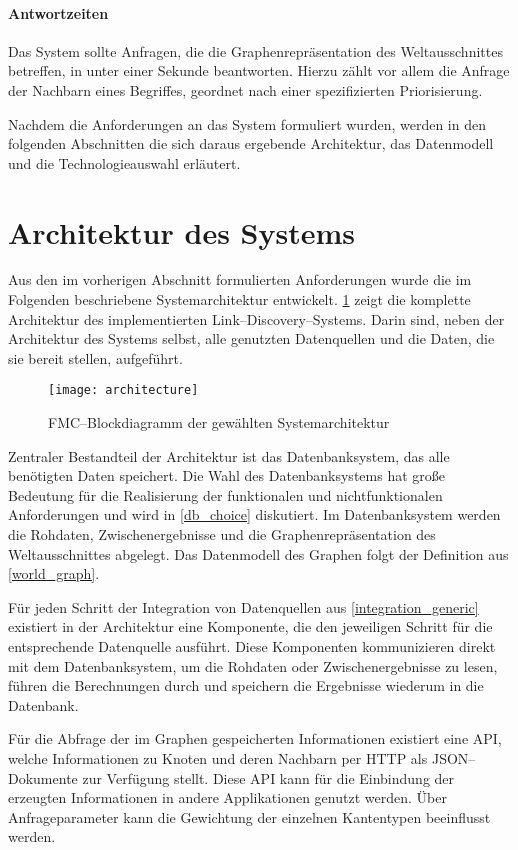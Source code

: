 \paragraph{Antwortzeiten} Das System sollte Anfragen, die die Graphenrepräsentation des Weltausschnittes betreffen, in unter einer Sekunde beantworten. Hierzu zählt vor allem die Anfrage der Nachbarn eines Begriffes, geordnet nach einer spezifizierten Priorisierung.

Nachdem die Anforderungen an das System formuliert wurden, werden in den folgenden Abschnitten die sich daraus ergebende Architektur, das Datenmodell und die Technologieauswahl erläutert.

\section{Architektur des Systems}
\label{architecture}

Aus den im vorherigen Abschnitt formulierten Anforderungen wurde die im Folgenden beschriebene Systemarchitektur entwickelt. \cref{fig:architecture} zeigt die komplette Architektur des implementierten Link--Discovery--Systems. Darin sind, neben der Architektur des Systems selbst, alle genutzten Datenquellen und die Daten, die sie bereit stellen, aufgeführt.

\begin{figure}[t]
\centering
\texttt{[image: architecture]}
\caption{FMC--Blockdiagramm der gewählten Systemarchitektur}
\label{fig:architecture}
\end{figure}

Zentraler Bestandteil der Architektur ist das Datenbanksystem, das alle benötigten Daten speichert. Die Wahl des Datenbanksystems hat große Bedeutung für die Realisierung der funktionalen und nichtfunktionalen Anforderungen und wird in \cref{db_choice} diskutiert. Im Datenbanksystem werden die Rohdaten, Zwischenergebnisse und die Graphenrepräsentation des Weltausschnittes abgelegt. Das Datenmodell des Graphen folgt der Definition aus \cref{world_graph}.

Für jeden Schritt der Integration von Datenquellen aus \cref{integration_generic} existiert in der Architektur eine Komponente, die den jeweiligen Schritt für die entsprechende Datenquelle ausführt. Diese Komponenten kommunizieren direkt mit dem Datenbanksystem, um die Rohdaten oder Zwischenergebnisse zu lesen, führen die Berechnungen durch und speichern die Ergebnisse wiederum in die Datenbank.

Für die Abfrage der im Graphen gespeicherten Informationen existiert eine API, welche Informationen zu Knoten und deren Nachbarn per HTTP als JSON--Dokumente \cite{json2006} zur Verfügung stellt. Diese API kann für die Einbindung der erzeugten Informationen in andere Applikationen genutzt werden. Über Anfrageparameter kann die Gewichtung der einzelnen Kantentypen beeinflusst werden.

